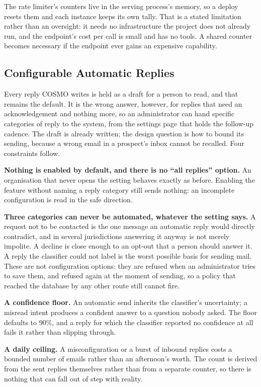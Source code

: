 \documentclass[a4paper]{article}
\begin{document}
The rate limiter's counters live in the serving process's memory, so a deploy
resets them and each instance keeps its own tally. That is a stated limitation
rather than an oversight: it needs no infrastructure the project does not
already run, and the endpoint's cost per call is small and has no tools. A
shared counter becomes necessary if the endpoint ever gains an expensive
capability.

\subsection{Configurable Automatic Replies}
\label{sec:auto-reply}

Every reply COSMO writes is held as a draft for a person to read, and that
remains the default. It is the wrong answer, however, for replies that need an
acknowledgement and nothing more, so an administrator can hand specific
categories of reply to the system, from the settings page that holds the
follow-up cadence. The draft is already written; the design question is how to
bound its sending, because a wrong email in a prospect's inbox cannot be
recalled. Four constraints follow.

\textbf{Nothing is enabled by default, and there is no ``all replies''
option.} An organisation that never opens the setting behaves exactly as
before. Enabling the feature without naming a reply category still sends
nothing: an incomplete configuration is read in the safe direction.

\textbf{Three categories can never be automated, whatever the setting says.}
A request not to be contacted is the one message an automatic reply would
directly contradict, and in several jurisdictions answering it anyway is not
merely impolite. A decline is close enough to an opt-out that a person should
answer it. A reply the classifier could not label is the worst possible basis
for sending mail. These are not configuration options: they are refused when an
administrator tries to save them, and refused again at the moment of sending,
so a policy that reached the database by any other route still cannot fire.

\textbf{A confidence floor.} An automatic send inherits the classifier's
uncertainty; a misread intent produces a confident answer to a question nobody
asked. The floor defaults to 90\%, and a reply for which the classifier
reported no confidence at all fails it rather than slipping through.

\textbf{A daily ceiling.} A misconfiguration or a burst of inbound replies
costs a bounded number of emails rather than an afternoon's worth. The count is
derived from the sent replies themselves rather than from a separate counter,
so there is nothing that can fall out of step with reality.
\end{document}
